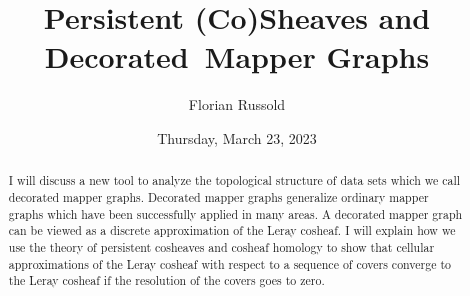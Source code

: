 \documentclass{UAmathtalk}
\author{Florian Russold}
\title{Persistent (Co)Sheaves and Decorated~Mapper Graphs}
\date{Thursday, March 23, 2023}
\begin{document}
\maketitle

\begin{abstract}
I will discuss a new tool to analyze the topological structure of data sets which we call decorated mapper graphs. Decorated mapper graphs generalize ordinary mapper graphs which have been successfully applied in many areas. A decorated mapper graph can be viewed as a discrete approximation of the Leray cosheaf. I will explain how we use the theory of persistent cosheaves and cosheaf homology to show that cellular approximations of the Leray cosheaf with respect to a sequence of covers converge to the Leray cosheaf if the resolution of the covers goes to zero.
\end{abstract}
\end{document}
